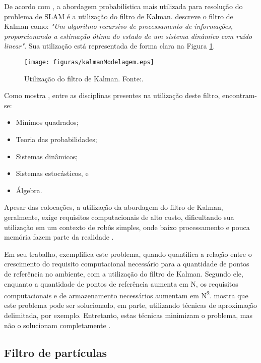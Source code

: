 De acordo com \cite{slamProblem}, a abordagem probabilística mais utilizada para resolução do problema de SLAM é a utilização do filtro de Kalman. \cite{theCleaningProject} descreve o filtro de Kalman como: \textit{"Um algoritmo recursivo de processamento de informações, proporcionando a estimação ótima do estado de um sistema dinâmico com ruído linear"}. Sua utilização está representada de forma clara na Figura \ref{img:kalmanModelagem}.

\begin{figure}[H]
	\centering
	\texttt{[image: figuras/kalmanModelagem.eps]}
	\caption[Utilização do filtro de Kalman]{Utilização do filtro de Kalman. Fonte:\cite{agenteExploratorioKalman}.}
	\label{img:kalmanModelagem}
\end{figure}

Como mostra \cite{theCleaningProject}, entre as disciplinas presentes na utilização deste filtro, encontram-se:
\begin{itemize}
	\item Mínimos quadrados;
	\item Teoria das probabilidades;
	\item Sistemas dinâmicos;
	\item Sistemas estocásticos, e
	\item Álgebra.
\end{itemize}

Apesar das colocações, a utilização da abordagem do filtro de Kalman, geralmente, exige requisitos computacionais de alto custo, dificultando sua utilização em um contexto de robôs simples, onde baixo processamento e pouca memória fazem parte da realidade \cite{agenteExploratorioKalman}.

 Em seu trabalho, \cite{slamProblem} exemplifica este problema, quando quantifica a relação entre o crescimento do requisito computacional necessário para a quantidade de pontos de referência no ambiente, com a utilização do filtro de Kalman. Segundo ele, enquanto a quantidade de pontos de referência aumenta em N, os requisitos computacionais e de armazenamento necessários aumentam em N\textsuperscript{2}. \cite{slamProblem} mostra que este problema pode ser solucionado, em parte, utilizando técnicas de aproximação delimitada, por exemplo. Entretanto, estas técnicas minimizam o problema, mas não o solucionam completamente \cite{slamProblem}.


 \subsection{Filtro de partículas} %
 \label{sub:filtro_de_partículas}

